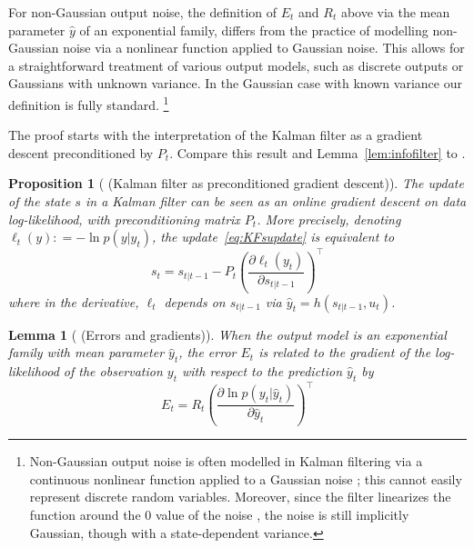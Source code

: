 \documentclass[11pt,a4paper]{article}
\newcommand{\deq}{\mathrel{\mathop{:}}=}
\newcommand{\1}{\mathbbm{1}}
\theoremstyle{yannthm}
\newtheorem{prop}[defi]{Proposition}
\newtheorem{lem}[defi]{Lemma}
\theoremstyle{yannthm2}
\newcommand{\transp}[1]{#1^{\!\top}\!}
\numberwithin{equation}{section}
\begin{document}
For non-Gaussian output noise, the definition of $E_t$ and $R_t$ above
via the mean parameter $\hat y$ of an exponential family,
differs from the practice of modelling non-Gaussian noise via a nonlinear
function applied to Gaussian noise. This allows for a straightforward
treatment of various output models, such as discrete outputs or Gaussians
with unknown variance. In the
Gaussian case with known variance our definition is fully standard.
\footnote{Non-Gaussian output noise is often modelled in
Kalman filtering via a continuous nonlinear function applied to a
Gaussian noise \cite[13.1]{simon2006kalmanbook}; this cannot easily represent discrete random variables.
Moreover, since the filter linearizes the function around the $0$ value
of the noise \cite[13.1]{simon2006kalmanbook}, the noise is still
implicitly Gaussian, though with a state-dependent
variance.\label{ft:nongaussian}}

\bigskip

The proof starts with the interpretation of the Kalman filter as a
gradient descent preconditioned by $P_t$. Compare this result and
Lemma~\ref{lem:infofilter} to
\cite[(5.68)--(5.73)]{Haykin_book}.

\begin{prop}[ (Kalman filter as preconditioned gradient descent)]
\label{prop:Kalmanasgrad}
The update of the state $s$ in a Kalman filter can be seen as an online gradient
descent on data log-likelihood, with preconditioning matrix $P_t$. More
precisely, denoting $\ell_t(y)\deq -\ln p(y|\hat y_t)$, the update~\eqref{eq:KFsupdate} is equivalent to
\begin{equation}
s_t=s_{t|t-1}-P_t \transp{\left(\frac{\partial \ell_t(y_t)}{\partial s_{t|t-1}}\right)}
\end{equation}
where in the derivative, $\ell_t$ depends on $s_{t|t-1}$ via $\hat
y_t=h(s_{t|t-1},u_t)$.
\end{prop}

\begin{lem}[ (Errors and gradients)]
\label{lem:errisgrad}
When the output model is an exponential family with mean parameter $\hat
y_t$,
the error $E_t$ is related to the gradient of the log-likelihood of the
observation $y_t$ with respect to the prediction $\hat y_t$ by
\[
E_{t} = R_{t} \transp{\left(\frac{\partial \ln 
p(y_{t}|\hat y_{t})}{\partial \hat y_t}\right)}
\]
\end{lem}
\end{document}
